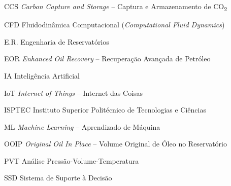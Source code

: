 \documentclass[
  12pt,
  a4paper,
  oneside,
  brazilian,
  sumario=tradicional
]{abntex2}
\begin{document}
\listoftables*
\cleardoublepage

\begin{siglas}
  \item[CCS]    \textit{Carbon Capture and Storage} -- Captura e Armazenamento de CO\textsubscript{2}
  \item[CFD]    Fluidodinâmica Computacional (\textit{Computational Fluid Dynamics})
  \item[E.R.]   Engenharia de Reservatórios
  \item[EOR]    \textit{Enhanced Oil Recovery} -- Recuperação Avançada de Petróleo
  \item[IA]     Inteligência Artificial
  \item[IoT]    \textit{Internet of Things} -- Internet das Coisas
  \item[ISPTEC] Instituto Superior Politécnico de Tecnologias e Ciências
  \item[ML]     \textit{Machine Learning} -- Aprendizado de Máquina
  \item[OOIP]   \textit{Original Oil In Place} -- Volume Original de Óleo no Reservatório
  \item[PVT]    Análise Pressão-Volume-Temperatura
  \item[SSD]    Sistema de Suporte à Decisão
\end{siglas}
\end{document}
